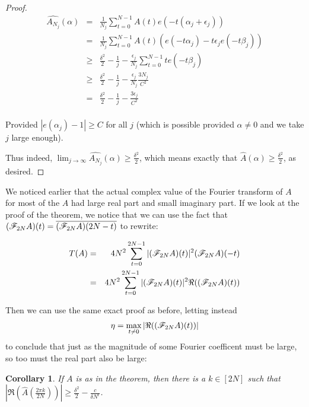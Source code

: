 \documentclass{article}
\newtheorem{corollary}{Corollary}[theorem]
\theoremstyle{definition}
\theoremstyle{remark}
\numberwithin{equation}{section}
\begin{document}
\begin{proof}
  \begin{eqnarray*}
    \widehat{A_{N_j}}(\alpha) &=& \frac{1}{N_j} \sum_{t=0}^{N-1} A(t)
                                  e(-t(\alpha_j+\epsilon_j))\\
                              &=& \frac{1}{N_j} \sum_{t=0}^{N-1} A(t)
                                  (e(-t\alpha_j)-t\epsilon_je(-t\beta_j))\\
                              &\geq& \frac{\delta^2}{2} - \frac{1}{j}
                                     - \frac{\epsilon_j}{N_j} \sum_{t=0}^{N-1}
                                     t e(-t\beta_j)\\
                              &\geq& \frac{\delta^2}{2} - \frac{1}{j}
                                     - \frac{\epsilon_j}{N_j} \frac{3N_j}{C^2}\\
                              &=& \frac{\delta^2}{2} - \frac{1}{j}
                                  - \frac{3\epsilon_j}{C^2}\\
  \end{eqnarray*}

  Provided $|e(\alpha_j) - 1| \geq C$ for all $j$ (which is possible
  provided $\alpha \neq 0$ and we take $j$ large enough).

  Thus indeed,
  $\lim_{j \to \infty} \widehat{A_{N_j}}(\alpha) \geq
  \frac{\delta^2}{2}$, which means exactly that
  $\widehat{A}(\alpha) \geq \frac{\delta^2}{2}$, as desired.
\end{proof}

We noticed earlier that the actual complex value of the Fourier
transform of $A$ for most of the $A$ had large real part and small
imaginary part.  If we look at the proof of the theorem, we notice
that we can use the fact that
$(\mathscr{F}_{2N}A)(t) = \overline{(\mathscr{F}_{2N}A)(2N-t)}$ to rewrite:

\begin{eqnarray*}
T(A) &=& 4 N^2 \sum_{t=0}^{2N-1} |(\mathscr{F}_{2N}A)(t)|^2(\mathscr{F}_{2N}A)(-t)\\
 &=& 4 N^2 \sum_{t=0}^{2N-1} |(\mathscr{F}_{2N}A)(t)|^2\Re((\mathscr{F}_{2N}A)(t))
\end{eqnarray*}

Then we can use the same exact proof as before, letting instead
\[\eta = \max_{t \neq 0} |\Re((\mathscr{F}_{2N}A)(t))|\] to conclude that
just as the magnitude of some Fourier coefficent must be large, so too
must the real part also be large:

\begin{corollary}\label{thm:alpha_real}
  If $A$ is as in the theorem, then there is a $k \in [2N]$ such that
  $|\Re(\widehat{A}(\frac{2\pi k}{2N}))| \geq \frac{\delta^2}{2} -
  \frac{c}{\delta N^\epsilon}$.
\end{corollary}
\end{document}
